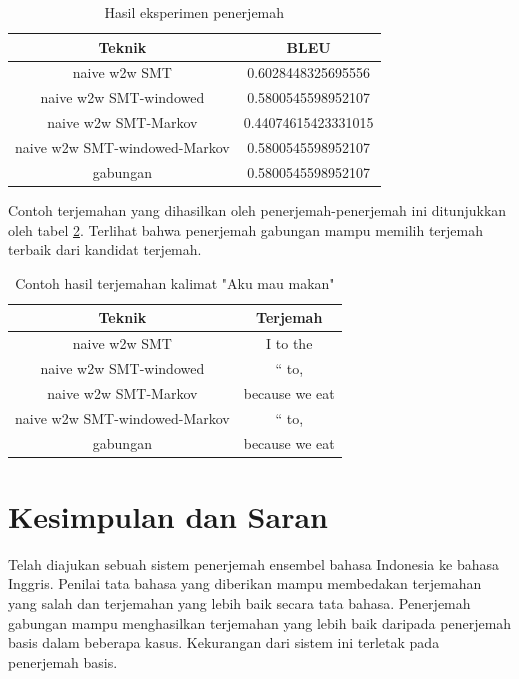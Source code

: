\documentclass[conference]{IEEEtran}
\begin{document}
\begin{table}
\caption{Hasil eksperimen penerjemah}
\begin{center}
\begin{tabular}{|c|c|}
\hline
\textbf{Teknik}&\textbf{BLEU}\\
\hline
naive w2w SMT & 0.6028448325695556 \\
\hline
naive w2w SMT-windowed & 0.5800545598952107\\
\hline
naive w2w SMT-Markov & 0.44074615423331015\\
\hline
naive w2w SMT-windowed-Markov & 0.5800545598952107\\
\hline
gabungan & 0.5800545598952107\\
\hline
\end{tabular}
\end{center}
\label{tableBLEU}
\end{table}

Contoh terjemahan yang dihasilkan oleh penerjemah-penerjemah ini ditunjukkan oleh tabel \ref{tablecontohterjemah}. Terlihat bahwa penerjemah gabungan mampu memilih terjemah terbaik dari kandidat terjemah.

\begin{table}
\caption{Contoh hasil terjemahan kalimat "Aku mau makan"}
\begin{center}
\begin{tabular}{|c|c|}
\hline
\textbf{Teknik}&\textbf{Terjemah}\\
\hline
naive w2w SMT & I to the \\
\hline
naive w2w SMT-windowed & `` to,\\
\hline
naive w2w SMT-Markov & because we eat\\
\hline
naive w2w SMT-windowed-Markov & `` to,\\
\hline
gabungan & because we eat\\
\hline
\end{tabular}
\end{center}
\label{tablecontohterjemah}
\end{table}

\section{Kesimpulan dan Saran}

Telah diajukan sebuah sistem penerjemah ensembel bahasa Indonesia ke bahasa Inggris. Penilai tata bahasa yang diberikan mampu membedakan terjemahan yang salah dan terjemahan yang lebih baik secara tata bahasa. Penerjemah gabungan mampu menghasilkan terjemahan yang lebih baik daripada penerjemah basis dalam beberapa kasus. Kekurangan dari sistem ini terletak pada penerjemah basis.
\end{document}
